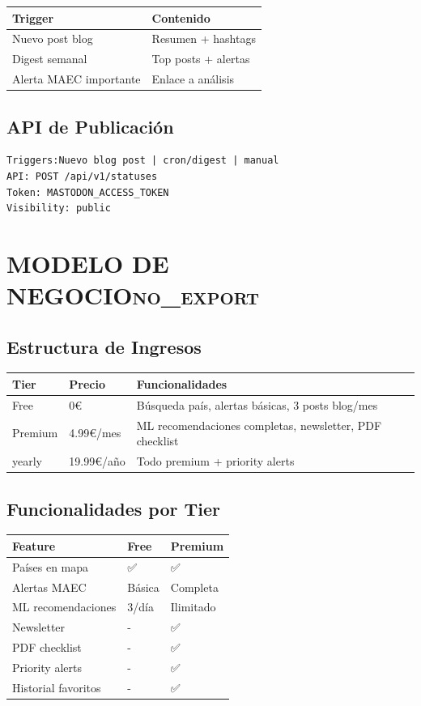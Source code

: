 \documentclass[11pt]{article}
\begin{document}
\begin{center}
\begin{tabular}{ll}
Trigger & Contenido\\
\hline
Nuevo post blog & Resumen + hashtags\\
Digest semanal & Top posts + alertas\\
Alerta MAEC importante & Enlace a análisis\\
\end{tabular}
\end{center}

\subsection{API de Publicación}
\label{sec:org50d761a}

\begin{verbatim}
Triggers:Nuevo blog post | cron/digest | manual
API: POST /api/v1/statuses
Token: MASTODON_ACCESS_TOKEN
Visibility: public
\end{verbatim}

\section{MODELO DE NEGOCIO\hfill{}\textsc{no\_export}}
\label{sec:org076d7f8}
\subsection{Estructura de Ingresos}
\label{sec:org50cb266}

\begin{center}
\begin{tabular}{lll}
Tier & Precio & Funcionalidades\\
\hline
Free & 0€ & Búsqueda país, alertas básicas, 3 posts blog/mes\\
Premium & 4.99€/mes & ML recomendaciones completas, newsletter, PDF checklist\\
yearly & 19.99€/año & Todo premium + priority alerts\\
\end{tabular}
\end{center}

\subsection{Funcionalidades por Tier}
\label{sec:org260d364}

\begin{center}
\begin{tabular}{lll}
Feature & Free & Premium\\
\hline
Países en mapa & ✅ & ✅\\
Alertas MAEC & Básica & Completa\\
ML recomendaciones & 3/día & Ilimitado\\
Newsletter & - & ✅\\
PDF checklist & - & ✅\\
Priority alerts & - & ✅\\
Historial favoritos & - & ✅\\
\end{tabular}
\end{center}
\end{document}
